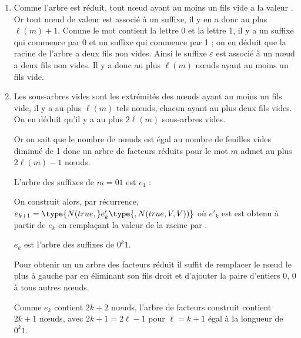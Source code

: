 \begin{Exercise}
\begin{enumerate}
    \item Comme l'arbre est réduit, tout nœud ayant au moins un fils vide a la valeur . Or tout nœud de valeur  est associé à un suffixe, il y en a donc au plus $\ell(m)+1$. Comme le mot contient la lettre 0 et la lettre 1, il y a un suffixe qui commence par 0 et un suffixe qui commence par 1 ; on en déduit que la racine de l'arbre a deux fils non vides. Ainsi le suffixe $\varepsilon$ est associé à un nœud a deux fils non vides. Il y a donc au plus $\ell(m)$ nœuds ayant au moins un fils vide.
    \item Les sous-arbres vides sont les extrémités des nœuds ayant au moins un fils vide, il y a au plus $\ell(m)$ tels nœuds, chacun ayant au plus deux fils vides. On en déduit qu'il y a au plus $2\ell(m)$ sous-arbres vides. 
    
    Or on sait que le nombre de nœuds est égal au nombre de feuilles vides diminué de 1 donc un arbre de facteurs réduits pour le mot $m$ admet au plus $2\ell(m)-1$ nœuds.
    
    L'arbre des suffixes de $m=01$ est $e_1$ :

\begin{center}
\end{center}
     On construit alors, par récurrence, $e_{k+1}=\type{N(true,} e'_k\type{, N(true, V, V))}$ où $e'_k$ est est obtenu à partir de $e_k$ en remplaçant la valeur de la racine par .
     
     $e_k$ est l'arbre des suffixes de $0^k1$.
     
     Pour obtenir un un arbre des facteurs réduit il suffit de remplacer le nœud le plus à gauche par  en éliminant son fils droit et d'ajouter la paire d'entiers 0, 0 à tous autres nœuds.
     
     Comme $e_k$ contient $2k+2$ nœuds, l'arbre de facteurs construit contient $2k+1$ nœuds, avec $2k+1 = 2\ell -1 $ pour $\ell = k+1$ égal à la longueur de $0^k1$.
    

\end{enumerate}
\end{Exercise}
